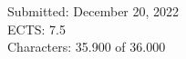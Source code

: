 \begin{titlepage}
\begin{flushleft}
{\large Submitted: December 20, 2022}\\ %
{\large ECTS: 7.5}\\
{\large Characters: 35.900 of 36.000}\\[2cm]
\end{flushleft}

 

\vfill %

\end{titlepage}